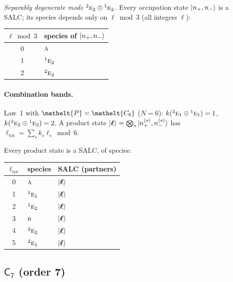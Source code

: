 \documentclass[11pt]{article}
\newcommand{\eltfont}[1]{{\let\sigma\eltsigma\mathelt{#1}}}
\newcommand{\grp}[1]{\mathsf{#1}}
\newcommand{\irr}[1]{\text{\normalfont\scshape #1}}
\newcommand{\conjpair}[1]{{}^{#1}}
\newcommand{\elt}[1]{\eltfont{#1}}
\newcommand{\pel}{\elt{P}}             %
\begin{document}
\emph{Separably degenerate mode $\conjpair{2}\irr{e}_{2}\oplus \conjpair{1}\irr{e}_{2}$.} Every occupation state $\ket{n_+,n_-}$ is a SALC; its species depends only on $\ell\bmod 3$ (all integers $\ell$):
\begin{longtable}{c l}\hline $\ell\bmod 3$ & species of $\ket{n_+,n_-}$\\ \hline\endhead
0 & $\irr{a}$\\
1 & $\conjpair{1}\irr{e}_{2}$\\
2 & $\conjpair{2}\irr{e}_{2}$\\
\hline\end{longtable}

\paragraph{Combination bands.}

Law~1 with $\pel=\elt{C_{6}}$ ($N=6$): $k(\conjpair{2}\irr{e}_{1}\oplus \conjpair{1}\irr{e}_{1})=1$, $k(\conjpair{2}\irr{e}_{2}\oplus \conjpair{1}\irr{e}_{2})=2$. A product state $\ket{\boldsymbol\ell}=\bigotimes_s\ket{n_+^{(s)},n_-^{(s)}}$ has $\ell_{\mathrm{tot}}=\sum_sk_s\ell_s\bmod 6$.

Every product state is a SALC, of species:

\begin{longtable}{c l l}\hline $\ell_{\mathrm{tot}}$ & species & SALC (partners)\\ \hline\endhead

0 & $\irr{a}$ & $\ket{\boldsymbol\ell}$\\

1 & $\conjpair{1}\irr{e}_{1}$ & $\ket{\boldsymbol\ell}$\\

2 & $\conjpair{1}\irr{e}_{2}$ & $\ket{\boldsymbol\ell}$\\

3 & $\irr{b}$ & $\ket{\boldsymbol\ell}$\\

4 & $\conjpair{2}\irr{e}_{2}$ & $\ket{\boldsymbol\ell}$\\

5 & $\conjpair{2}\irr{e}_{1}$ & $\ket{\boldsymbol\ell}$\\

\hline\end{longtable}

\subsection*{$\grp{C_{7}}$ \quad (order 7)}
\end{document}
